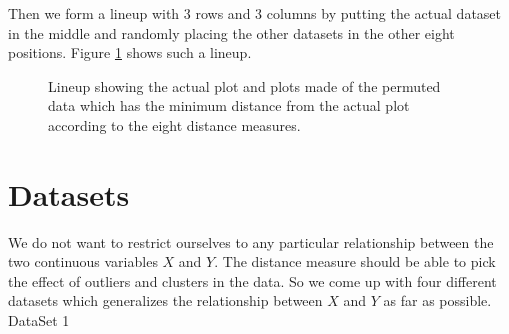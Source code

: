 \documentclass[12]{report}
\begin{document}
Then we form a lineup with 3 rows and 3 columns by putting the actual dataset in the middle and randomly placing the other datasets in the other eight positions. Figure \ref{minimum} shows such a lineup.

\begin{figure}[htbp]
   \centering
	\vspace{-.2in}
       \caption{Lineup showing the actual plot and plots made of the permuted data which has the minimum distance from the actual plot according to the eight distance measures.  }
       \label{minimum}
\end{figure}      
\newpage

\section{Datasets}

We do not want to restrict ourselves to any particular relationship between the two continuous variables $X$ and $Y$. The distance measure should be able to pick the effect of outliers and clusters in the data. So we come up with four different datasets which generalizes the relationship between $X$ and $Y$ as far as possible. \\[2cm]

\Large{DataSet 1}\\

\normalsize
\end{document}
